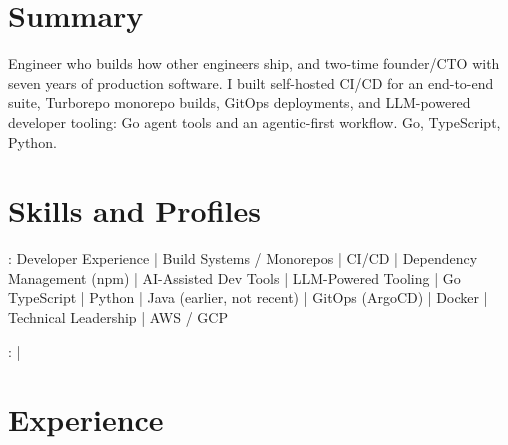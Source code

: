 \documentclass[print]{jack-resume}
\begin{document}
\pagecolor{darkmodeBackground}


\begin{minipage}[t][1cm][t]{.03\textwidth}
    \hfill
\end{minipage}

\section{Summary}
Engineer who builds how other engineers ship, and two-time founder/CTO with seven years of production software. I built self-hosted CI/CD for an end-to-end suite, Turborepo monorepo builds, GitOps deployments, and LLM-powered developer tooling: Go agent tools and an agentic-first workflow. Go, TypeScript, Python.
\sectionsep

\section{Skills and Profiles}
:
Developer Experience \hfill | \hfill
Build Systems / Monorepos \hfill | \hfill
CI/CD \hfill | \hfill
Dependency Management (npm) \hfill | \hfill
AI-Assisted Dev Tools \hfill | \hfill
LLM-Powered Tooling \hfill | \hfill
Go \\
\hspace{1.0cm} TypeScript \hfill | \hfill
Python \hfill | \hfill
Java (earlier, not recent) \hfill | \hfill
GitOps (ArgoCD) \hfill | \hfill
Docker \hfill | \hfill
Technical Leadership \hfill | \hfill
AWS / GCP \\

\raggedright{
    :
      \href{https://www.linkedin.com/in/jack-sturtevant/}{ \ExternalLink} |
     \href{https://github.com/jacksturt}{ \ExternalLink}}

\section{Experience}
\end{document}
